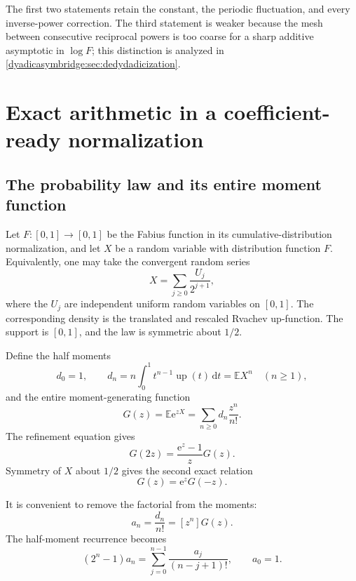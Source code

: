 \documentclass[11pt,oneside]{article}
\theoremstyle{definition}
\theoremstyle{remark}
\newcommand{\Up}{\operatorname{up}}
\newcommand{\e}{\mathrm e}
\newcommand{\dd}{\,\mathrm d}
\newcommand{\E}{\mathbb E}
\begin{document}
The first two statements retain the constant, the periodic fluctuation, and every inverse-power correction.  The third statement is weaker because the mesh between consecutive reciprocal powers is too coarse for a sharp additive asymptotic in $\log F$; this distinction is analyzed in \cref{dyadicasymbridge:sec:dedydadicization}.

\section{Exact arithmetic in a coefficient-ready normalization}
\label{dyadicasymbridge:sec:exact-layer}

\subsection{The probability law and its entire moment function}

Let $F:[0,1]\to[0,1]$ be the Fabius function in its cumulative-distribution normalization, and let $X$ be a random variable with distribution function $F$.  Equivalently, one may take the convergent random series
\begin{equation}
 X=\sum_{j\ge0}\frac{U_j}{2^{j+1}},
\label{dyadicasymbridge:eq:random-series}
\end{equation}
where the $U_j$ are independent uniform random variables on $[0,1]$.  The corresponding density is the translated and rescaled Rvachev up-function.  The support is $[0,1]$, and the law is symmetric about $1/2$.

Define the half moments
\begin{equation}
 d_0=1,
 \qquad
 d_n=n\int_0^1t^{n-1}\Up(t)\dd t=\E X^n
 \quad(n\ge1),
\label{dyadicasymbridge:eq:d-moments}
\end{equation}
and the entire moment-generating function
\begin{equation}
 G(z)=\E\e^{zX}=\sum_{n\ge0}d_n\frac{z^n}{n!}.
\label{dyadicasymbridge:eq:G-def}
\end{equation}
The refinement equation gives
\begin{equation}
 G(2z)=\frac{\e^z-1}{z}G(z).
\label{dyadicasymbridge:eq:G-functional}
\end{equation}
Symmetry of $X$ about $1/2$ gives the second exact relation
\begin{equation}
 G(z)=\e^zG(-z).
\label{dyadicasymbridge:eq:G-symmetry}
\end{equation}

It is convenient to remove the factorial from the moments:
\begin{equation}
 a_n=\frac{d_n}{n!}=[z^n]G(z).
\label{dyadicasymbridge:eq:a-def}
\end{equation}
The half-moment recurrence becomes
\begin{equation}
 (2^n-1)a_n=
 \sum_{j=0}^{n-1}\frac{a_j}{(n-j+1)!},
 \qquad a_0=1.
\label{dyadicasymbridge:eq:a-recurrence}
\end{equation}
\end{document}
